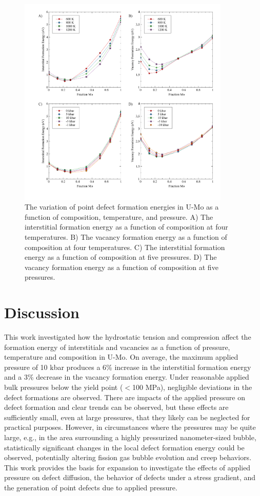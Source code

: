 \documentclass[default]{sn-jnl}%
\begin{document}
\begin{figure}[htbp]
\begin{center}
\includegraphics[width=0.9\textwidth]{figA.pdf} 
\caption{The variation of point defect formation energies in U-Mo as a function of composition, temperature, and pressure. A) The interstitial formation energy as a function of composition at four temperatures. B) The vacancy formation energy as a function of composition at four temperatures. C) The interstitial formation energy as a function of composition at five pressures. D) The vacancy formation energy as a function of composition at five pressures. }
\label{fig:A}
\end{center}
\end{figure}

\section{Discussion}\label{sec4}
This work investigated how the hydrostatic tension and compression affect the formation energy of interstitials and vacancies as a function of pressure, temperature and composition in U-Mo. On average, the maximum applied pressure of 10 kbar produces a 6\% increase in the interstitial formation energy and a 3\% decrease in the vacancy formation energy. Under reasonable applied bulk pressures below the yield point ($<$100 MPa), negligible deviations in the defect formations are observed. There are impacts of the applied pressure on defect formation and clear trends can be observed, but these effects are sufficiently small, even at large pressures, that they likely can be neglected for practical purposes. However, in circumstances where the pressures may be quite large, e.g., in the area surrounding a highly pressurized nanometer-sized bubble, statistically significant changes in the local defect formation energy could be observed, potentially altering fission gas bubble evolution and creep behaviors. This work provides the basis for expansion to investigate the effects of applied pressure on defect diffusion, the behavior of defects under a stress gradient, and the generation of point defects due to applied pressure. 
\end{document}
